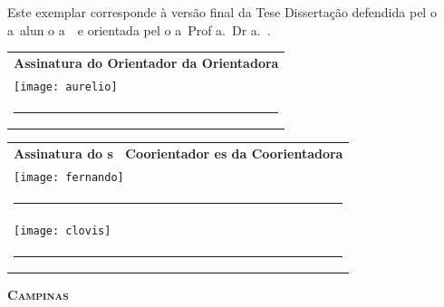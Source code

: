 \vfill



\begin{flushleft}
  \begin{minipage}[c]{.5\textwidth}\footnotesize 
 Este exemplar corresponde à versão final da
\ifx\mestrado\undefined
    Tese
    \else
    Dissertação
    \fi
    defendida pel\ifx\femaleOrientador\undefined
    o\else
  a\fi\
  alun\ifx\femaleOrientador\undefined
    o\else
  a\fi\
  \autor\
    e orientada 
    pel\ifx\femaleOrientador\undefined
    o\else
  a\fi\
  Prof\ifx\femaleOrientador\undefined
    \else
  a\fi.~Dr\ifx\femaleOrientador\undefined
    \else
  a\fi.~\orientador.
 \end{minipage}
\end{flushleft}

\vfill
\noindent
\begin{tabular}{l}
{\small\textbf{Assinatura
\ifx\femaleOrientador\undefined
do Orientador
\else
da Orientadora
\fi
}} \\
\texttt{[image: aurelio]}\\[-5mm]
\rule[1pt]{6cm}{.5pt} 
\\[0.4cm]
\end{tabular}

\noindent
\begin{tabular}{l}
\ifx\coorientador\undefined
\else
{\small\textbf{Assinatura
\ifx\femaleCoorientador\undefined
do\ifx\Coorientadores\undefined
\else s \fi\
Coorientador\ifx\Coorientadores\undefined
\else es \fi 
\else
da Coorientadora
\fi } }
 \\
 \texttt{[image: fernando]}\\[-9mm]
\rule[1pt]{6cm}{.5pt} \\ %
 \ifx\Coorientadores\undefined
 \else
\texttt{[image: clovis]}\\[-11mm]
\rule[1pt]{6cm}{.5pt}  %
\fi
\end{tabular}

\vfill
\begin{center}
  {\small\textbf{\textsc{ Campinas \\ \ano}}}
\end{center}
